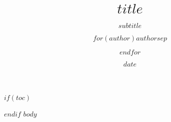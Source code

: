 \documentclass[presentation]{beamer}
\title{$title$}
\subtitle{$subtitle$}
\author{$for(author)$$author$$sep$ \and $endfor$}
\institute{$for(institute)$$institute$$sep$ \and $endfor$}
\date{$date$}
\begin{document}
\maketitle

$if(toc)$
\begin{frame}
\tableofcontents[hideallsubsections]
\end{frame}

$endif$
$body$
\end{document}
